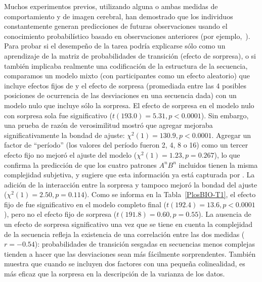 Muchos experimentos previos, utilizando alguna o ambas medidas de comportamiento y de imagen cerebral, han demostrado que los individuos constantemente generan predicciones de futuras observaciones usando el conocimiento probabilístico basado en observaciones anteriores (por ejemplo,~\cite{f19,f20}). Para probar si el desempeño de la tarea podría explicarse sólo como un aprendizaje de la matriz de probabilidades de transición (efecto de sorpresa), o si también implicaba realmente una codificación de la estructura de la secuencia, comparamos un modelo mixto (con participantes como un efecto aleatorio) que incluye efectos fijos de \mdlbin y el efecto de sorpresa (promediada entre las 4 posibles posiciones de ocurrencia de las desviaciones en una secuencia dada) con un modelo nulo que incluye sólo la sorpresa. El efecto de sorpresa en el modelo nulo con sorpresa sola fue significativo ($t(193.0) = 5.31, p < 0.0001$). Sin embargo, una prueba de razón de verosimilitud mostró que agregar \mdlbin mejoraba significativamente la bondad de ajuste: $\chi^2(1) = 130.9, p < 0.0001$. Agregar un factor de ``período'' (los valores del período fueron 2, 4, 8 o 16) como un tercer efecto fijo no mejoró el ajuste del modelo ($\chi^2(1) = 1.23, p = 0.267$), lo que confirma la predicción de que los cuatro patrones $A^n B^n$ incluidos tienen la misma complejidad subjetiva, y sugiere que esta información ya está capturada por \mdlbin. La adición de la interacción entre la sorpresa y \mdlbin tampoco mejoró la bondad del ajuste ($\chi^2(1) = 2.50, p = 0.114$). Como se informa en la Tabla~\ref{PlosBIO-T1}, el efecto fijo de \mdlbin fue significativo en el modelo completo final ($t(192.4) = 13.6, p < 0.0001$), pero no el efecto fijo de sorpresa ($t (191.8) = 0.60, p = 0.55$). La ausencia de un efecto de sorpresa significativo una vez que se tiene en cuenta la complejidad de la secuencia refleja la existencia de una correlación entre las dos medidas ($r = -0.54$): probabilidades de transición sesgadas en secuencias menos complejas tienden a hacer que las desviaciones sean más fácilmente sorprendentes. También muestra que cuando se incluyen dos factores con una pequeña colinealidad, \mdlbin es más eficaz que la sorpresa en la descripción de la varianza de los datos.


